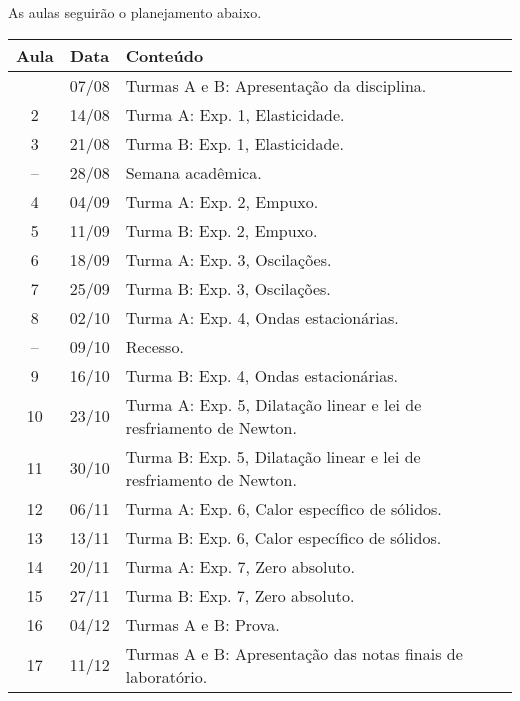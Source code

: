 As aulas seguirão o planejamento abaixo.
\begin{center}
\begin{longtable}{ccp{70mm}}
\toprule
Aula & Data & Conteúdo \\
\midrule
\endhead
\bottomrule
\endfoot
 1 & 07/08 & Turmas A e B: Apresentação da disciplina. \\
 2 & 14/08 & Turma A: Exp. 1, Elasticidade. \\
 3 & 21/08 & Turma B: Exp. 1, Elasticidade. \\
-- & 28/08 & Semana acadêmica. \\ 
 4 & 04/09 & Turma A: Exp. 2, Empuxo. \\
 5 & 11/09 & Turma B: Exp. 2, Empuxo. \\
 6 & 18/09 & Turma A: Exp. 3, Oscilações. \\
 7 & 25/09 & Turma B: Exp. 3, Oscilações. \\
 8 & 02/10 & Turma A: Exp. 4, Ondas estacionárias. \\
-- & 09/10 & Recesso. \\
 9 & 16/10 & Turma B: Exp. 4, Ondas estacionárias. \\
10 & 23/10 & Turma A: Exp. 5, Dilatação linear e lei de resfriamento de Newton. \\
11 & 30/10 & Turma B: Exp. 5, Dilatação linear e lei de resfriamento de Newton. \\
12 & 06/11 & Turma A: Exp. 6, Calor específico de sólidos. \\
13 & 13/11 & Turma B: Exp. 6, Calor específico de sólidos. \\
14 & 20/11 & Turma A: Exp. 7, Zero absoluto. \\
15 & 27/11 & Turma B: Exp. 7, Zero absoluto. \\
16 & 04/12 & Turmas A e B: Prova. \\
17 & 11/12 & Turmas A e B: Apresentação das notas finais de laboratório.
\end{longtable}
\end{center}


